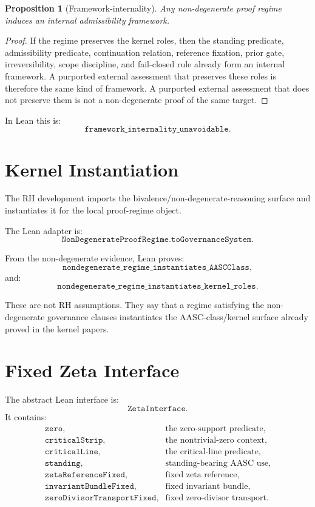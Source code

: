 \documentclass[11pt]{article}
\newtheorem{proposition}{Proposition}
\begin{document}
\begin{proposition}[Framework-internality]
Any non-degenerate proof regime induces an internal admissibility framework.
\end{proposition}

\begin{proof}
If the regime preserves the kernel roles, then the standing predicate,
admissibility predicate, continuation relation, reference fixation, prior
gate, irreversibility, scope discipline, and fail-closed rule already form an
internal framework.  A purported external assessment that preserves these
roles is therefore the same kind of framework.  A purported external
assessment that does not preserve them is not a non-degenerate proof of the
same target.
\end{proof}

In Lean this is:
\[
\texttt{framework\_internality\_unavoidable}.
\]

\section{Kernel Instantiation}

The RH development imports the bivalence/non-degenerate-reasoning surface and
instantiates it for the local proof-regime object.

The Lean adapter is:
\[
\texttt{NonDegenerateProofRegime.toGovernanceSystem}.
\]

From the non-degenerate evidence, Lean proves:
\[
\texttt{nondegenerate\_regime\_instantiates\_AASCClass},
\]
and:
\[
\texttt{nondegenerate\_regime\_instantiates\_kernel\_roles}.
\]

These are not RH assumptions.  They say that a regime satisfying the
non-degenerate governance clauses instantiates the AASC-class/kernel surface
already proved in the kernel papers.

\section{Fixed Zeta Interface}

The abstract Lean interface is:
\[
\texttt{ZetaInterface}.
\]
It contains:
\[
\begin{array}{ll}
\texttt{zero}, & \text{the zero-support predicate},\\
\texttt{criticalStrip}, & \text{the nontrivial-zero context},\\
\texttt{criticalLine}, & \text{the critical-line predicate},\\
\texttt{standing}, & \text{standing-bearing AASC use},\\
\texttt{zetaReferenceFixed}, & \text{fixed zeta reference},\\
\texttt{invariantBundleFixed}, & \text{fixed invariant bundle},\\
\texttt{zeroDivisorTransportFixed}, & \text{fixed zero-divisor transport}.
\end{array}
\]
\end{document}
